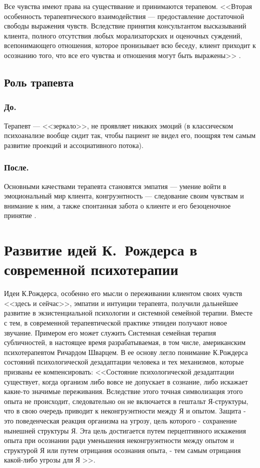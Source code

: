 \documentclass{../../common/thesisbyxetex}
\begin{document}
Все чувства имеют права на существвание и принимаются терапевом. <<Вторая особенность 
терапевтического взаимодей­ствия — предоставление достаточной свободы выражения чувств. Вследствие 
принятия консультантом высказыва­ний клиента, полного отсутствия любых морализаторских и оценочных 
суждений, всепонимающего отношения, которое пронизывает всю беседу, клиент приходит к осоз­нанию 
того, что все его чувства и отношения могут быть выражены>> \cite[40]{rogersConsult}.

\subsection*{Роль трапевта}

\subsubsection*{До.}

Терапевт --- <<зеркало>>, не проявляет никаких эмоций (в классическом психоанализе 
вообще сидит так, чтобы пациент не видел его, поощряя тем самым развитие проекций и ассоциативного 
потока).

\subsubsection*{После.}

Основными качествами терапевта становятся эмпатия --- умение войти в эмоциональный мир клиента, 
конгруэнтность --- следование своим чувствам и внимание к ним, а также спонтанная забота о клиенте 
и его безоценочное принятие \cite{rogersConsult}.

\section{Развитие идей К.~Рождерса в современной психотерапии}

Идеи К.Рождерса, особенно его мысли о переживании клиентом своих чувств <<здесь и сейчас>>, эмпатии 
и интуиции терапевта, получили дальнейшее развитие в экзистенциальной психологии и системной 
семейной терапии. Вместе с тем, в современной терапевтической практике этиидеи получают новое 
звучание. Примером его может служить Системная семейная терапия субличностей, в настоящее время 
разрабатываемая, в том числе, американским психотерапевтом Ричардом Шварцем. В ее основу легло 
понимание К.Рождерса состояний психологической дезадаптации человека и тех механизмов, которые 
призваны ее компенсировать: <<Состояние психологической дезадаптации существует, когда организм 
либо вовсе не допускает в сознание, либо искажает какие-то значимые переживания. Вследствие этого 
точная символизация этого опыта не происходит, следовательно он не включается в гештальт 
Я-структуры, что в свою очередь приводит к неконгруэнтности между Я и опытом. Защита - это 
поведенческая реакция организма на угрозу, цель которого - сохранение нынешней структуры Я. Эта цель 
достигается путем перцептивного искажения опыта при осознании ради уменьшения неконгруэнтности между 
опытом и структурой Я или путем отрицания осознания опыта, - тем самым отрицания какой-либо угрозы 
для Я >>\cite{mid}.
\end{document}
